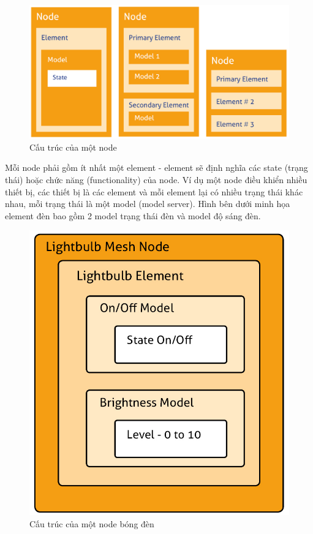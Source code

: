             \begin{figure}[h!]
            	\begin{center}
            		\includegraphics[scale=0.2]{images/mesh-node.jpg}
            		\caption{Cấu trúc của một node}
            	\end{center}
            \end{figure}

            Mỗi node phải gồm ít nhất một element - element sẽ định nghĩa các state (trạng thái) hoặc chức năng (functionality) của node. Ví dụ một node điều khiển nhiều thiết bị, các thiết bị là các element và mỗi element lại có nhiều trạng thái khác nhau, mỗi trạng thái là một model (model server). Hình bên dưới minh họa element đèn bao gồm 2 model trạng thái đèn và model độ sáng đèn.
            \begin{figure}[h!]
            	\begin{center}
            		\includegraphics[scale=0.2]{images/lighbulb-node.jpg}
            		\caption{Cấu trúc của một node bóng đèn}
            	\end{center}
            \end{figure}

